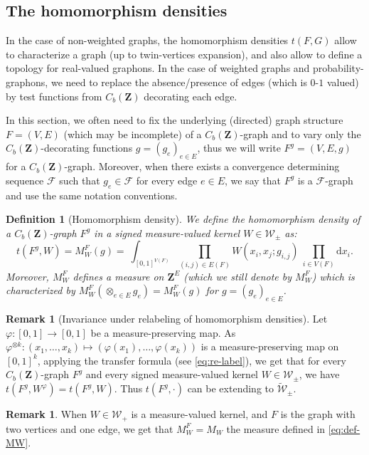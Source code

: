 \documentclass{amsart}
\theoremstyle{plain}
\newtheorem{defin}[Th]{Definition}
\theoremstyle{definition}
\newtheorem{remark}[Th]{Remark}
\newcommand{\Space}{\mathbf{Z}}
\newcommand{\signed}{\pm}
\newcommand{\CbFunct}{C_b(\Space)}
\newcommand{\Kernel}{\mathcal{W}_{\signed}}
\newcommand{\Kernelp}{\mathcal{W}_{+}}
\newcommand{\UKernel}{\widetilde{\mathcal{W}}_{\signed}}
\newcommand{\F}{\mathcal{F}}
\newcommand{\drv}{\mathrm{d}}
\begin{document}
\subsection{The homomorphism densities}

In the case of non-weighted graphs, the homomorphism densities $t(F,G)$
allow to characterize a graph (up to twin-vertices expansion),
and also allow to define a topology for real-valued graphons.
In the case of weighted graphs and probability-graphons, 
we need to replace the absence/presence of edges
(which is $0$-$1$ valued) by test functions from $\CbFunct$ decorating each edge.

In this section, 
we often need to fix the underlying (directed) graph structure $F = (V,E)$ 
	(which may be incomplete)
	of a $\CbFunct$-graph
and to vary only the $\CbFunct$-decorating functions $g=(g_e)_{e\in E}$,
thus we will write $F^g=(V,E,g)$ for a $\CbFunct$-graph.
Moreover, when there exists a convergence determining
	sequence $\F$ such that 
	$g_e\in\F$ for every edge $e\in E$,
we say that $F^g$ is a $\F$-graph 
	and use the same notation conventions.
	

\begin{defin}[Homomorphism density]
	\label{def_hom_dens}
We define the \emph{homomorphism density} of a $\CbFunct$-graph $F^g$
in a signed measure-valued kernel $W\in\Kernel$ as:
\begin{equation}\label{eq_def_hom_dens}
t(F^g,W) = M_W^F(g) 
= \ \int_{[0,1]^{V(F)}}  \prod_{(i,j)\in E(F)} W(x_i,x_j; g_{i,j})		\	\prod_{i\in V(F)} \drv x_i	 .
\end{equation}
Moreover, $M_W^F$ defines a measure on $\Space^E$
(which we still denote by $M_W^F$) which is characterized by
$M_W^F(\otimes_{e\in E} g_e)=M_W^F(g) $
	for $g = (g_e)_{e\in E}$.
\end{defin}

\begin{remark}[Invariance under relabeling of homomorphism densities]
	\label{rem_dens_homo_inv}
Let $\varphi : [0,1] \to [0,1]$ be a measure-preserving map.
As $\varphi^{\otimes k} : (x_1, \dots, x_k) \mapsto (\varphi(x_1), \dots, \varphi(x_k))$ is a measure-preserving map on $[0,1]^k$, 
applying the transfer formula (see \eqref{eq:re-label}),
we get that for every $\CbFunct$-graph $F^g$
and every signed measure-valued kernel $W\in\Kernel$,
we have $t(F^g, W^\varphi) = t(F^g, W)$.
Thus $t(F^g, \cdot)$ can be extending to $\UKernel$.
\end{remark}


\begin{remark}
When $W\in\Kernelp$ is a measure-valued kernel,
and $F$ is the graph with two vertices and one edge, 
we get that $M_W^F = M_W$ the measure defined in \eqref{eq:def-MW}.
\end{remark}
\end{document}
